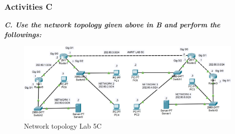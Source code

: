 \documentclass[a4paper,11pt]{article}
\begin{document}
\pagebreak

%
%
%



%
%
%
\subsubsection{Activities C}

{\bfseries \textit{C. Use the network topology given above in B and perform the followings:}}
\begin{figure}[H]
    \centering
    \includegraphics[scale=0.50,cframe=blue 0.5pt 3pt]{Lab5C.jpg}
    \caption{Network topology Lab 5C}
\end{figure}
\end{document}
